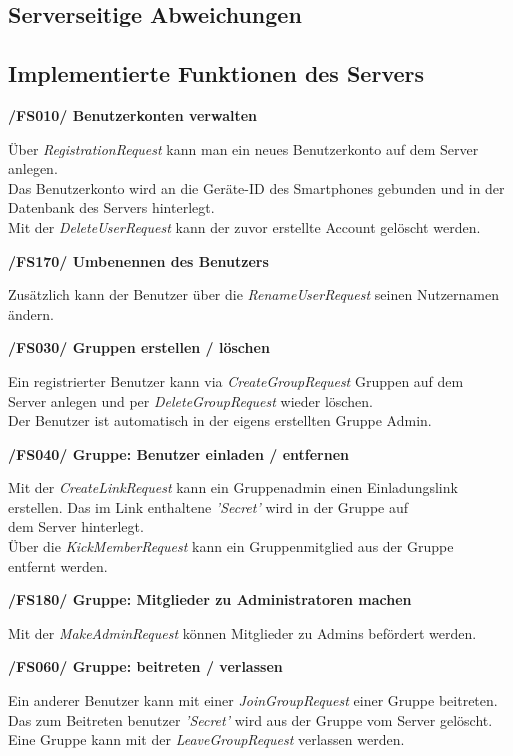 \subsection{Serverseitige Abweichungen}


\subsection{Implementierte Funktionen des Servers}

\textbf{/FS010/ Benutzerkonten verwalten}

Über \textit{RegistrationRequest} kann man ein neues Benutzerkonto auf dem Server anlegen.\\
Das Benutzerkonto wird an die Geräte-ID des Smartphones gebunden und in der\\
Datenbank des Servers hinterlegt.\\
Mit der \textit{DeleteUserRequest} kann der zuvor erstellte Account gelöscht werden.

\textbf{/FS170/ Umbenennen des Benutzers}

Zusätzlich kann der Benutzer über die \textit{RenameUserRequest} seinen Nutzernamen ändern.

\textbf{/FS030/ Gruppen erstellen / löschen}

Ein registrierter Benutzer kann via \textit{CreateGroupRequest} Gruppen auf dem\\
Server anlegen und per \textit{DeleteGroupRequest} wieder löschen.\\
Der Benutzer ist automatisch in der eigens erstellten Gruppe Admin.

\textbf{/FS040/ Gruppe: Benutzer einladen / entfernen}

Mit der \textit{CreateLinkRequest} kann ein Gruppenadmin einen Einladungslink\\
erstellen. Das im Link enthaltene \textit{'Secret'} wird in der Gruppe auf\\
dem Server hinterlegt.\\
Über die \textit{KickMemberRequest} kann ein Gruppenmitglied aus der Gruppe\\
entfernt werden.

\textbf{/FS180/ Gruppe: Mitglieder zu Administratoren machen}

Mit der \textit{MakeAdminRequest} können Mitglieder zu Admins befördert werden.

\textbf{/FS060/ Gruppe: beitreten / verlassen}

Ein anderer Benutzer kann mit einer \textit{JoinGroupRequest} einer Gruppe beitreten.\\
Das zum Beitreten benutzer \textit{'Secret'} wird aus der Gruppe vom Server gelöscht.\\
Eine Gruppe kann mit der \textit{LeaveGroupRequest} verlassen werden.

